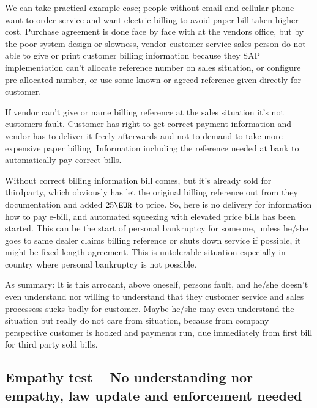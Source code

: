 We can take practical example case; people without email and cellular
phone\cite{HS202412141445} want to order service and want electric billing
to avoid paper bill taken higher cost. Purchase agreement is done face by face
with at the vendors office, but by the poor system design or slowness, vendor
customer service sales person do not able to give or print customer billing
information because they SAP implementation can't allocate reference number on
sales situation, or configure pre-allocated number, or use some known or
agreed reference given directly for customer.

If vendor can't give or name billing reference at the sales situation it's not
customers fault. Customer has right to get correct payment information and
vendor has to deliver it freely afterwards and not to demand to take more
expensive paper billing. Information including the reference needed at bank to
automatically pay correct bills.

Without correct billing information bill comes, but it's already sold for
thirdparty, which obviously has let the original billing reference out from
they documentation and added $25\EUR$ to price. So, here is no delivery for
information how to pay e-bill, and automated squeezing with elevated price
bills has been started. This can be the start of personal bankruptcy for
someone, unless he/she goes to same dealer claims billing reference or shuts
down service if possible, it might be fixed length agreement. This is
untolerable situation especially in country where personal bankruptcy
\cite{PersonalBankruptcy} is not possible.

As summary: It is this arrocant, above oneself, persons fault, and he/she
doesn't even understand nor willing to understand that they customer service
and sales processess sucks badly\cite{OwnFault} for
customer\cite{HS202412141445}. Maybe he/she may even understand the situation
but really do not care from situation, because from company perspective
customer is hooked and payments run, due immediately from first bill for
third party sold bills.

\subsection{Empathy test -- No understanding nor empathy, law update and enforcement needed}
\label{Empathy_test_fail_law_needed}

